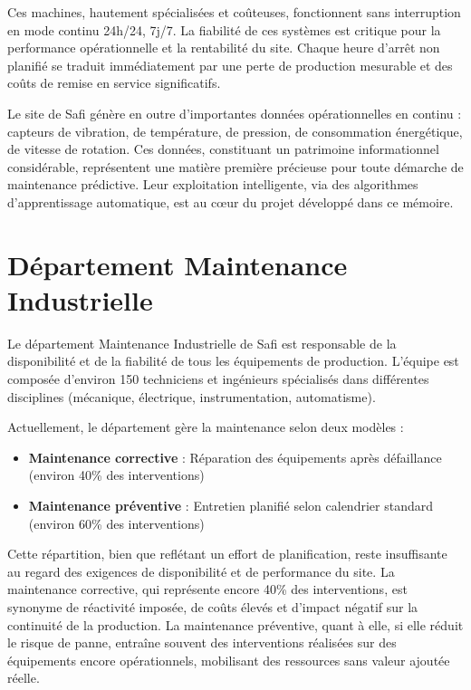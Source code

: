 \documentclass[a4paper,12pt]{report}
\begin{document}
Ces machines, hautement spécialisées et coûteuses, fonctionnent sans interruption en mode continu 24h/24, 7j/7. La fiabilité de ces systèmes est critique pour la performance opérationnelle et la rentabilité du site. Chaque heure d'arrêt non planifié se traduit immédiatement par une perte de production mesurable et des coûts de remise en service significatifs.

Le site de Safi génère en outre d'importantes données opérationnelles en continu : capteurs de vibration, de température, de pression, de consommation énergétique, de vitesse de rotation. Ces données, constituant un patrimoine informationnel considérable, représentent une matière première précieuse pour toute démarche de maintenance prédictive. Leur exploitation intelligente, via des algorithmes d'apprentissage automatique, est au cœur du projet développé dans ce mémoire.

\section{Département Maintenance Industrielle}

Le département Maintenance Industrielle de Safi est responsable de la disponibilité et de la fiabilité de tous les équipements de production. L'équipe est composée d'environ 150 techniciens et ingénieurs spécialisés dans différentes disciplines (mécanique, électrique, instrumentation, automatisme).

Actuellement, le département gère la maintenance selon deux modèles :
\begin{itemize}
    \item \textbf{Maintenance corrective} : Réparation des équipements après défaillance (environ 40\% des interventions)
    \item \textbf{Maintenance préventive} : Entretien planifié selon calendrier standard (environ 60\% des interventions)
\end{itemize}

Cette répartition, bien que reflétant un effort de planification, reste insuffisante au regard des exigences de disponibilité et de performance du site. La maintenance corrective, qui représente encore 40\% des interventions, est synonyme de réactivité imposée, de coûts élevés et d'impact négatif sur la continuité de la production. La maintenance préventive, quant à elle, si elle réduit le risque de panne, entraîne souvent des interventions réalisées sur des équipements encore opérationnels, mobilisant des ressources sans valeur ajoutée réelle.
\end{document}
